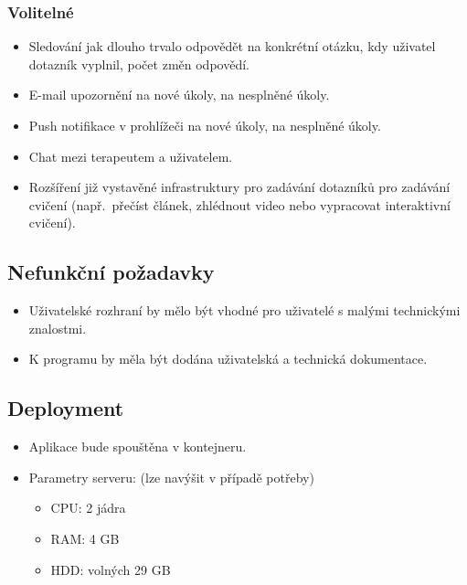 \subsubsection{Volitelné}

\begin{itemize}
\item
  Sledování jak dlouho trvalo odpovědět na konkrétní otázku, kdy uživatel dotazník vyplnil, počet změn odpovědí.
\item
  E-mail upozornění na nové úkoly, na nesplněné úkoly.
\item
  Push notifikace v prohlížeči na nové úkoly, na nesplněné úkoly.
\item
  Chat mezi terapeutem a uživatelem.
\item
  Rozšíření již vystavěné infrastruktury pro zadávání dotazníků pro zadávání cvičení (např.\ přečíst článek, zhlédnout video nebo vypracovat interaktivní cvičení).
\end{itemize}


\subsection{Nefunkční požadavky}\label{subsec:nefunkcni-pozadavky}

\begin{itemize}
\item
  Uživatelské rozhraní by mělo být vhodné pro uživatelé s malými technickými znalostmi.
\item
  K programu by měla být dodána uživatelská a technická dokumentace.
\end{itemize}


\subsection{Deployment}\label{subsec:deployment}

\begin{itemize}
\item
  Aplikace bude spouštěna v kontejneru.
\item
  Parametry serveru: (lze navýšit v případě potřeby)

  \begin{itemize}
  \item
    CPU: 2 jádra
  \item
    RAM: 4 GB
  \item
    HDD: volných 29 GB
  \end{itemize}
\end{itemize}


